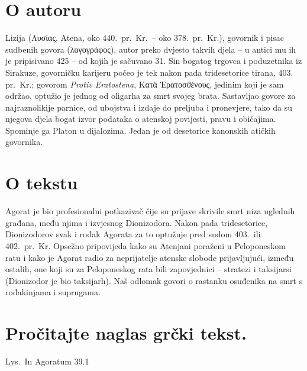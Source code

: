 
\section*{O autoru}

Lizija (Λυσίας, Atena, oko 440.\ pr.~Kr.\ – oko 378.\ pr.~Kr.), govornik i pisac sudbenih govora \textgreek[variant=ancient]{(λογογράφος),} autor preko dvjesto takvih djela – u antici mu ih je pripisivano 425 – od kojih je sačuvano 31. Sin bogatog trgovca i poduzetnika iz Sirakuze, govorničku karijeru počeo je tek nakon pada tridesetorice tirana, 403. pr.~Kr.; govorom \textit{Protiv Eratostena}, \textgreek[variant=ancient]{Κατὰ Ἐρατοσϑένους,} jedinim koji je sam održao, optužio je jednog od oligarha za smrt svojeg brata. Sastavljao govore za najraznolikije parnice, od ubojstva i izdaje do preljuba i pronevjere, tako da su njegova djela bogat izvor podataka o atenskoj povijesti, pravu i običajima. Spominje ga Platon u dijalozima. Jedan je od desetorice kanonskih atičkih govornika.

\section*{O tekstu}

Agorat je bio profesionalni potkazivač čije su prijave skrivile smrt niza uglednih građana, među njima i izvjesnog Dionizodora. Nakon pada tridesetorice, Dionizodorov svak i rođak Agorata za to optužuje pred sudom 403.\ ili 402.\ pr.~Kr. Opsežno pripovijeda kako su Atenjani poraženi u Peloponeskom ratu i kako je Agorat radio za neprijatelje atenske slobode prijavljujući, između ostalih, one koji su za Peloponeskog rata bili zapovjednici – stratezi i taksijarsi (Dionizodor je bio taksijarh). Naš odlomak govori o rastanku osuđenika na smrt s rođakinjama i suprugama.

\newpage

\section*{Pročitajte naglas grčki tekst.}

Lys.\ In Agoratum 39.1

\medskip

